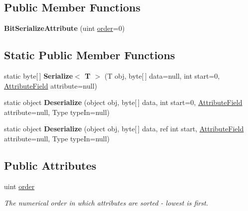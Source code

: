 \subsection*{Public Member Functions}
\begin{DoxyCompactItemize}
\item 
\hypertarget{class_bit_serialize_attribute_a28774b3727990228edb19840f2e9badd}{{\bfseries Bit\-Serialize\-Attribute} (uint \hyperlink{class_bit_serialize_attribute_ad0a026f7b3c5c95879852db7a66a2726}{order}=0)}\label{class_bit_serialize_attribute_a28774b3727990228edb19840f2e9badd}

\end{DoxyCompactItemize}
\subsection*{Static Public Member Functions}
\begin{DoxyCompactItemize}
\item 
\hypertarget{class_bit_serialize_attribute_ad468b24a1856f4caa6878fa1816b1a02}{static byte\mbox{[}$\,$\mbox{]} {\bfseries Serialize$<$ T $>$} (T obj, byte\mbox{[}$\,$\mbox{]} data=null, int start=0, \hyperlink{class_bit_serialize_attribute_1_1_attribute_field}{Attribute\-Field} attribute=null)}\label{class_bit_serialize_attribute_ad468b24a1856f4caa6878fa1816b1a02}

\item 
\hypertarget{class_bit_serialize_attribute_a25ccfef7039f0ed04d5884a4817f4d60}{static object {\bfseries Deserialize} (object obj, byte\mbox{[}$\,$\mbox{]} data, int start=0, \hyperlink{class_bit_serialize_attribute_1_1_attribute_field}{Attribute\-Field} attribute=null, Type type\-In=null)}\label{class_bit_serialize_attribute_a25ccfef7039f0ed04d5884a4817f4d60}

\item 
\hypertarget{class_bit_serialize_attribute_abcbd2fdebdb8ab0a3105bf74e5714ece}{static object {\bfseries Deserialize} (object obj, byte\mbox{[}$\,$\mbox{]} data, ref int start, \hyperlink{class_bit_serialize_attribute_1_1_attribute_field}{Attribute\-Field} attribute=null, Type type\-In=null)}\label{class_bit_serialize_attribute_abcbd2fdebdb8ab0a3105bf74e5714ece}

\end{DoxyCompactItemize}
\subsection*{Public Attributes}
\begin{DoxyCompactItemize}
\item 
uint \hyperlink{class_bit_serialize_attribute_ad0a026f7b3c5c95879852db7a66a2726}{order}
\begin{DoxyCompactList}\small\item\em The numerical order in which attributes are sorted -\/ lowest is first. \end{DoxyCompactList}\end{DoxyCompactItemize}
